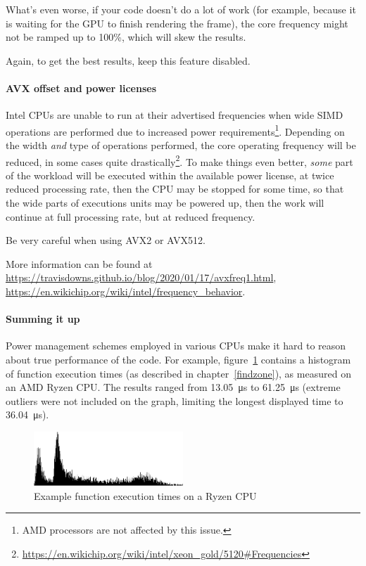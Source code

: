 \documentclass[hidelinks,titlepage,a4paper]{article}
\begin{document}
What's even worse, if your code doesn't do a lot of work (for example, because it is waiting for the GPU to finish rendering the frame), the core frequency might not be ramped up to 100\%, which will skew the results.

Again, to get the best results, keep this feature disabled.

\paragraph{AVX offset and power licenses}

Intel CPUs are unable to run at their advertised frequencies when wide SIMD operations are performed due to increased power requirements\footnote{AMD processors are not affected by this issue.}. Depending on the width \emph{and} type of operations performed, the core operating frequency will be reduced, in some cases quite drastically\footnote{\url{https://en.wikichip.org/wiki/intel/xeon_gold/5120\#Frequencies}}. To make things even better, \emph{some} part of the workload will be executed within the available power license, at twice reduced processing rate, then the CPU may be stopped for some time, so that the wide parts of executions units may be powered up, then the work will continue at full processing rate, but at reduced frequency.

Be very careful when using AVX2 or AVX512.

More information can be found at \url{https://travisdowns.github.io/blog/2020/01/17/avxfreq1.html}, \url{https://en.wikichip.org/wiki/intel/frequency_behavior}.

\paragraph{Summing it up}
\label{ryzen}

Power management schemes employed in various CPUs make it hard to reason about true performance of the code. For example, figure~\ref{ryzenimage} contains a histogram of function execution times (as described in chapter~\ref{findzone}), as measured on an AMD Ryzen CPU. The results ranged from 13.05~\si{\micro\second} to 61.25~\si{\micro\second} (extreme outliers were not included on the graph, limiting the longest displayed time to 36.04~\si{\micro\second}).

\begin{figure}[h]
\centering
\includegraphics[width=0.5\textwidth]{images/ryzen.png}
\caption{Example function execution times on a Ryzen CPU}
\label{ryzenimage}
\end{figure}
\end{document}
